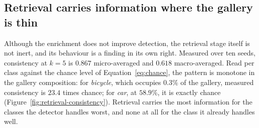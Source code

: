 \begin{table}[H]
\centering
\caption{Data-centric control matrix on VisDrone, ten seeds per condition. All conditions
start from the same checkpoint of the same seed and train for the same additional budget;
only the training data differs. Values from \texttt{output/F8\_v1\_primary.txt}.}
\label{tab:enrichment}
\end{table}

\subsection{Retrieval carries information where the gallery is thin}
\label{sec:results:retrieval}

Although the enrichment does not improve detection, the retrieval stage itself is not
inert, and its behaviour is a finding in its own right. Measured over ten seeds,
consistency at $k = 5$ is $0.867$ micro-averaged and $0.618$ macro-averaged. Read per class
against the chance level of Equation~\eqref{eq:chance}, the pattern is monotone in the
gallery composition: for \emph{bicycle}, which occupies $0.3\%$ of the gallery, measured
consistency is $23.4$ times chance; for \emph{car}, at $58.9\%$, it is exactly chance
(Figure~\ref{fig:retrieval-consistency}). Retrieval carries the most information for the
classes the detector handles worst, and none at all for the class it already handles well.


